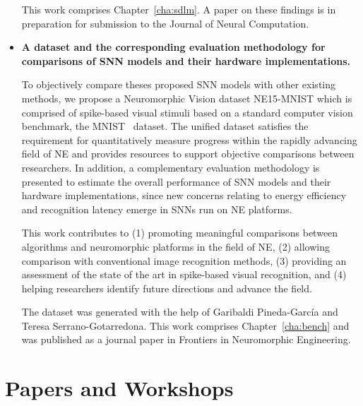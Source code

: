 \begin{itemize}
	This work comprises Chapter~\ref{cha:sdlm}.
	A paper on these findings is in preparation for submission to the Journal of Neural Computation.
	
	\item 
	\textbf{A dataset and the corresponding evaluation methodology for comparisons of SNN models and their hardware implementations.}
	
	To objectively compare theses proposed SNN models with other existing methods, we propose a Neuromorphic Vision dataset NE15-MNIST which is comprised of spike-based visual stimuli based on a standard computer vision benchmark, the MNIST~\citep{lecun1998gradient} dataset.
	The unified dataset satisfies the requirement for quantitatively measure progress within the rapidly advancing field of NE and provides resources to support objective comparisons between researchers.
	In addition, a complementary evaluation methodology is presented to estimate the overall performance of SNN models and their hardware implementations, since new concerns relating to energy efficiency and recognition latency emerge in SNNs run on NE platforms.
	
	This work contributes to (1) promoting meaningful comparisons between algorithms and neuromorphic platforms in the field of NE, (2) allowing comparison with conventional image recognition methods, (3) providing an assessment of the state of the art in spike-based visual recognition, and (4) helping researchers identify future directions and advance the field.
	
	The dataset was generated with the help of Garibaldi Pineda-Garc\'ia and Teresa Serrano-Gotarredona.
	This work comprises Chapter~\ref{cha:bench} and was published as a journal paper in Frontiers in Neuromorphic Engineering.
\end{itemize}

   
\section{Papers and Workshops}

